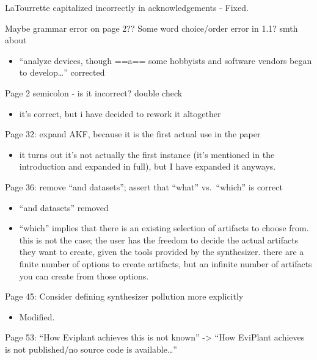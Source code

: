 LaTourrette capitalized incorrectly in acknowledgements - Fixed.

Maybe grammar error on page 2?? Some word choice/order error in 1.1?
smth about

\begin{itemize}
\tightlist
\item
  ``analyze devices, though ==a== some hobbyists and software vendors
  began to develop\ldots{}'' corrected
\end{itemize}

Page 2 semicolon - is it incorrect? double check

\begin{itemize}
\tightlist
\item
  it's correct, but i have decided to rework it altogether
\end{itemize}

Page 32: expand AKF, because it is the first actual use in the paper

\begin{itemize}
\tightlist
\item
  it turns out it's not actually the first instance (it's mentioned in
  the introduction and expanded in full), but I have expanded it
  anyways.
\end{itemize}

Page 36: remove ``and datasets''; assert that ``what'' vs.~``which'' is
correct

\begin{itemize}
\tightlist
\item
  ``and datasets'' removed
\item
  ``which'' implies that there is an existing selection of artifacts to
  choose from. this is not the case; the user has the freedom to decide
  the actual artifacts they want to create, given the tools provided by
  the synthesizer. there are a finite number of options to create
  artifacts, but an infinite number of artifacts you can create from
  those options.
\end{itemize}

Page 45: Consider defining synthesizer pollution more explicitly

\begin{itemize}
\tightlist
\item
  Modified.
\end{itemize}

Page 53: ``How Eviplant achieves this is not known'' -\textgreater{}
``How EviPlant achieves is not published/no source code is
available\ldots{}''

